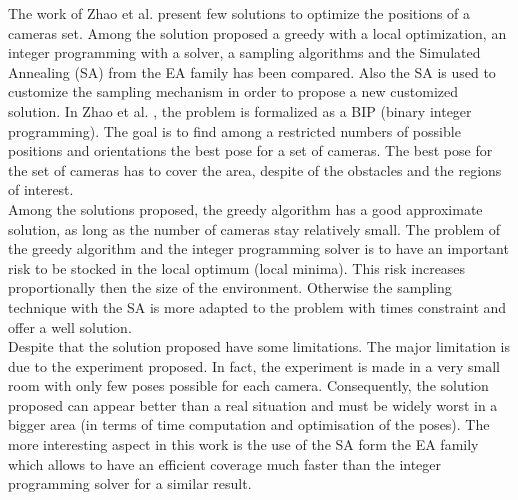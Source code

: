 The work of Zhao et al. \cite{151*zhao2013} present few solutions to optimize the positions of a cameras set. Among the solution proposed a greedy with a local optimization, an integer programming with a solver, a sampling algorithms and the Simulated Annealing (SA) from the EA family has been compared. Also the SA is used to customize the sampling mechanism in order to propose a new customized solution. 
In Zhao et al. \cite{151*zhao2013}, the problem is formalized as a BIP (binary integer programming).
  The goal is to find among a restricted numbers of possible positions and orientations the best pose for a set of cameras. The best pose for the set of cameras has to cover the area, despite of the obstacles and the regions of interest. \\
Among the solutions proposed, the greedy algorithm has a good approximate solution, as long as the number of cameras stay relatively small. The problem of the greedy algorithm and the integer programming solver is to have an important risk to be stocked in the local optimum (local minima). This risk increases proportionally then the size of the environment. Otherwise the sampling technique with the SA is more adapted to the problem with times constraint and offer a well solution.\\
Despite that the solution proposed have some limitations. The major limitation is due to the experiment proposed. In fact, the experiment is made in a very small room with only few poses possible for each camera. Consequently, the solution proposed can appear better than a real situation and must be widely worst in a bigger area (in terms of time computation and optimisation of the poses). The more interesting aspect in this work \citep{151*zhao2013} is the use of the SA form the EA family which allows to have an efficient coverage much faster than the integer programming solver for a similar result. 

